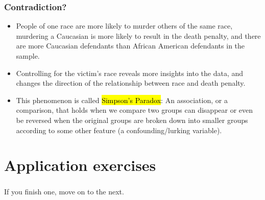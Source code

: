 \documentclass[11pt,containsverbatim,handout,xcolor=xelatex,dvipsnames,table]{beamer}
\begin{document}

\begin{frame}
\frametitle{Contradiction?}

\begin{itemize}

\item People of one race are more likely to murder others of the same race, murdering a Caucasian is more likely to result in the death penalty, and there are more Caucasian defendants than African American defendants in the sample.

\pause

\item Controlling for the victim's race reveals more insights into the data, and changes the direction of the relationship between race and death penalty.

\pause

\item This phenomenon is called \hl{Simpson's Paradox}: An association, or a comparison, that holds when we compare two groups can disappear or even be reversed when the original groups are broken down into smaller groups according to some other feature (a confounding/lurking variable).

\end{itemize}

\end{frame}


\section{Application exercises}


\begin{frame}
\frametitle{}

\vfill

If you finish one, move on to the next.




\vfill

\end{frame}

\end{document}
